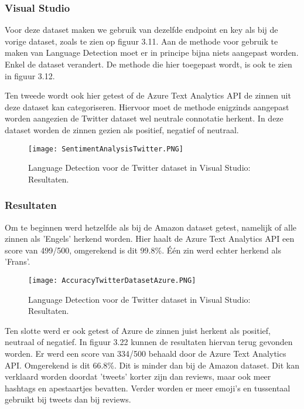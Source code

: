 \subsubsection{Visual Studio}
\label{twitterdatasetvisualstudioazure}
Voor deze dataset maken we gebruik van dezelfde endpoint en key als bij de vorige dataset, zoals te zien op figuur 3.11. Aan de methode voor gebruik te maken van Language Detection moet er in principe bijna niets aangepast worden. Enkel de dataset verandert. De methode die hier toegepast wordt, is ook te zien in figuur 3.12.

Ten tweede wordt ook hier getest of de Azure Text Analytics API de zinnen uit deze dataset kan categoriseren. Hiervoor moet de methode enigzinds aangepast worden aangezien de Twitter dataset wel neutrale connotatie herkent. In deze dataset worden de zinnen gezien als positief, negatief of neutraal. 

\begin{figure}[!htbp]
    \texttt{[image: SentimentAnalysisTwitter.PNG]}
    \caption{\label{azuresentimentanalysistwitter}Language Detection voor de Twitter dataset in Visual Studio: Resultaten.}
\end{figure}
\FloatBarrier 


\subsubsection{Resultaten}
\label{twitterdatasetresultatenazure}
Om te beginnen werd hetzelfde als bij de Amazon dataset getest, namelijk of alle zinnen als 'Engels' herkend worden. 
Hier haalt de Azure Text Analytics API een score van 499/500, omgerekend is dit 99.8\%. Één zin werd echter herkend als 'Frans'.

\begin{figure}[!htbp]
    \texttt{[image: AccuracyTwitterDatasetAzure.PNG]}
    \caption{\label{azurelanguagedetectiontwitterresults}Language Detection voor de Twitter dataset in Visual Studio: Resultaten.}
\end{figure}
\FloatBarrier 

Ten slotte werd er ook getest of Azure de zinnen juist herkent als positief, neutraal of negatief. In figuur 3.22 kunnen de resultaten hiervan terug gevonden worden. Er werd een score van 334/500 behaald door de Azure Text Analytics API. Omgerekend is dit 66.8\%. Dit is minder dan bij de Amazon dataset. Dit kan verklaard worden doordat 'tweets' korter zijn dan reviews, maar ook meer hashtags en apestaartjes bevatten. Verder worden er meer emoji's en tussentaal gebruikt bij tweets dan bij reviews.

